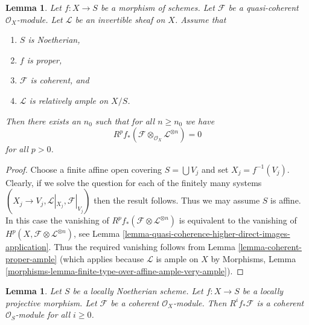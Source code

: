 \documentclass{stacks-project}
\theoremstyle{plain}
\newtheorem{lemma}[subsection]{Lemma}
\theoremstyle{definition}
\theoremstyle{remark}
\numberwithin{equation}{subsection}
\begin{document}
\begin{lemma}
\label{lemma-kill-by-twisting}
Let $f : X \to S$ be a morphism of schemes.
Let $\mathcal{F}$ be a quasi-coherent $\mathcal{O}_X$-module.
Let $\mathcal{L}$ be an invertible sheaf on $X$.
Assume that
\begin{enumerate}
\item $S$ is Noetherian,
\item $f$ is proper,
\item $\mathcal{F}$ is coherent, and
\item $\mathcal{L}$ is relatively ample on $X/S$.
\end{enumerate}
Then there exists an $n_0$ such that for all $n \geq n_0$
we have
$$
R^pf_*\left(\mathcal{F} \otimes_{\mathcal{O}_X} \mathcal{L}^{\otimes n}\right)
=
0
$$
for all $p > 0$.
\end{lemma}

\begin{proof}
Choose a finite affine open covering $S = \bigcup V_j$ and
set $X_j = f^{-1}(V_j)$.
Clearly, if we solve the question for each of the finitely many
systems $(X_j \to V_j, \mathcal{L}|_{X_j}, \mathcal{F}|_{V_j})$
then the result follows. Thus we may assume $S$ is affine.
In this case the vanishing of
$R^pf_*(\mathcal{F} \otimes \mathcal{L}^{\otimes n})$
is equivalent to the vanishing of
$H^p(X, \mathcal{F} \otimes \mathcal{L}^{\otimes n})$, see
Lemma \ref{lemma-quasi-coherence-higher-direct-images-application}.
Thus the required vanishing follows
from Lemma \ref{lemma-coherent-proper-ample} (which applies because
$\mathcal{L}$ is ample on $X$ by Morphisms, Lemma
\ref{morphisms-lemma-finite-type-over-affine-ample-very-ample}).
\end{proof}

\begin{lemma}
\label{lemma-locally-projective-pushforward}
Let $S$ be a locally Noetherian scheme.
Let $f : X \to S$ be a locally projective morphism.
Let $\mathcal{F}$ be a coherent $\mathcal{O}_X$-module.
Then $R^if_*\mathcal{F}$ is a coherent $\mathcal{O}_S$-module
for all $i \geq 0$.
\end{lemma}
\end{document}

